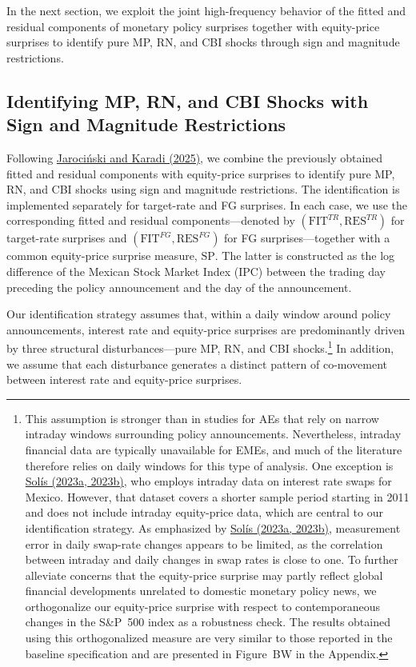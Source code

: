 \documentclass[12pt, reqno]{article}
\begin{document}
In the next section, we exploit the joint high-frequency behavior of the fitted and residual components of monetary policy surprises together with equity-price surprises to identify pure MP, RN, and CBI shocks through sign and magnitude restrictions.



\subsection{Identifying MP, RN, and CBI Shocks with Sign and Magnitude Restrictions}

Following \hyperlink{Jarociński and Karadi (2025)}{Jarociński and Karadi (2025)}, we combine the previously obtained fitted and residual components with equity-price surprises to identify pure MP, RN, and CBI shocks using sign and magnitude restrictions. The identification is implemented separately for target-rate and FG surprises. In each case, we use the corresponding fitted and residual components—denoted by $(\text{FIT}^{TR}, \text{RES}^{TR})$ for target-rate surprises and $(\text{FIT}^{FG}, \text{RES}^{FG})$ for FG surprises—together with a common equity-price surprise measure, $\text{SP}$. The latter is constructed as the log difference of the Mexican Stock Market Index (IPC) between the trading day preceding the policy announcement and the day of the announcement.


Our identification strategy assumes that, within a daily window around policy announcements, interest rate and equity-price surprises are predominantly driven by three structural disturbances—pure MP, RN, and CBI shocks.\footnote{This assumption is stronger than in studies for AEs that rely on narrow intraday windows surrounding policy announcements. Nevertheless, intraday financial data are typically unavailable for EMEs, and much of the literature therefore relies on daily windows for this type of analysis. One exception is \hyperlink{Solis (2023a)}{Solís (2023a, 2023b)}, who employs intraday data on interest rate swaps for Mexico. However, that dataset covers a shorter sample period starting in 2011 and does not include intraday equity-price data, which are central to our identification strategy.
As emphasized by \hyperlink{Solis (2023a)}{Solís (2023a, 2023b)}, measurement error in daily swap-rate changes appears to be limited, as the correlation between intraday and daily changes in swap rates is close to one. To further alleviate concerns that the equity-price surprise may partly reflect global financial developments unrelated to domestic monetary policy news, we orthogonalize our equity-price surprise with respect to contemporaneous changes in the S\&P~500 index as a robustness check. The results obtained using this orthogonalized measure are very similar to those reported in the baseline specification and are presented in Figure~BW in the Appendix.} In addition, we assume that each disturbance generates a distinct pattern of co-movement between interest rate and equity-price surprises.
\end{document}
